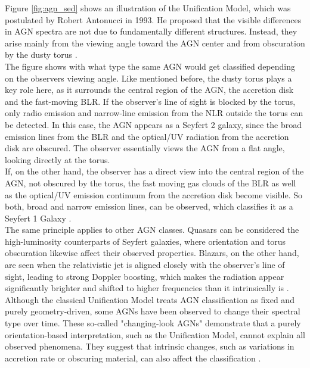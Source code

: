 Figure \ref{fig:agn_sed} shows an illustration of the Unification Model, which was postulated by Robert Antonucci in 1993. He proposed that the visible differences in AGN spectra are not due to fundamentally different structures. Instead, they arise mainly from the viewing angle toward the AGN center and from obscuration by the dusty torus \parencite{antonucci1993unified}.\\
The figure shows with what type the same AGN would get classified depending on the observers viewing angle. Like mentioned before, the dusty torus plays a key role here, as it surrounds the central region of the AGN, the accretion disk and the fast-moving BLR. If the observer's line of sight is blocked by the torus, only radio emission and narrow-line emission from the NLR outside the torus can be detected. In this case, the AGN appears as a Seyfert 2 galaxy, since the broad emission lines from the BLR and the optical/UV radiation from the accretion disk are obscured. The observer essentially views the AGN from a flat angle, looking directly at the torus.\\
If, on the other hand, the observer has a direct view into the central region of the AGN, not obscured by the torus, the fast moving gas clouds of the BLR as well as the optical/UV emission continuum from the accretion disk become visible. So both, broad and narrow emission lines, can be observed, which classifies it as a Seyfert 1 Galaxy \parencite{antonucci1993unified}.\\
The same principle applies to other AGN classes. Quasars can be considered the high-luminosity counterparts of Seyfert galaxies, where orientation and torus obscuration likewise affect their observed properties. Blazars, on the other hand, are seen when the relativistic jet is aligned closely with the observer’s line of sight, leading to strong Doppler boosting, which makes the radiation appear significantly brighter and shifted to higher frequencies than it intrinsically is \parencite{urry1995unified}.\\
Although the classical Unification Model treats AGN classification as fixed and purely geometry-driven, some AGNs have been observed to change their spectral type over time. These so-called "changing-look AGNs" demonstrate that a purely orientation-based interpretation, such as the Unification Model, cannot explain all observed phenomena. They suggest that intrinsic changes, such as variations in accretion rate or obscuring material, can also affect the classification \parencite{ricci2022changinglook}.




